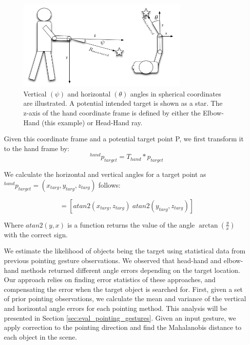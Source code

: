 \documentclass{tADR2e}
\begin{document}
\begin{figure}[h!]
\centering
\includegraphics[width=85mm]{pics/person_angles_combined_2.png}
\caption{Vertical $(\psi)$ and horizontal $(\theta)$ angles in spherical coordinates are illustrated. A potential intended target is shown as a star. The z-axis of the hand coordinate frame is defined by either the Elbow-Hand (this example) or Head-Hand ray.}
\label{fig:angle_errors}
\end{figure}

Given this coordinate frame and a potential target point P, we first transform it to the hand frame by:
\begin{equation}
^{hand}p_{target} = T_{hand} * p_{target}
\end{equation}

We calculate the horizontal and vertical angles for a target point as $^{hand}p_{target} = (x_{targ}, y_{targ}, z_{targ})$ follows:

\begin{equation}
[\theta_{target}\;\psi_{target}]=[atan2(x_{targ}, z_{targ})\;atan2(y_{targ}, z_{targ})]
\end{equation}

Where $atan2(y,x)$ is a function returns the value of the angle $\arctan(\frac{y}{x})$ with the correct sign.

We estimate the likelihood of objects being the target using statistical data from previous pointing gesture observations. We observed that head-hand and elbow-hand methods returned different angle errors depending on the target location. Our approach relies on finding error statistics of these approaches, and compensating the error when the target object is searched for. First, given a set of prior pointing observations, we calculate the mean and variance of the vertical and horizontal angle errors for each pointing method. This analysis will be presented in Section \ref{sec:eval_pointing_gestures}. Given an input gesture, we apply correction to the pointing direction and find the Mahalanobis distance to each object in the scene.
\end{document}
